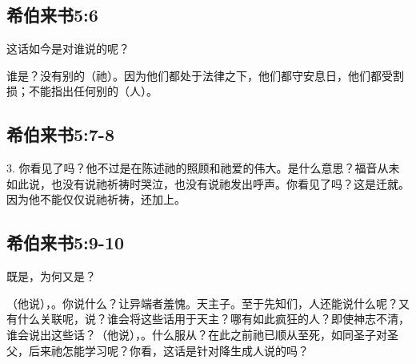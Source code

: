 
\subsection{希伯来书5:6}

这话如今是对谁说的呢？\par

谁是？没有别的（祂）。因为他们都处于法律之下，他们都守安息日，他们都受割损；不能指出任何别的（人）。\par


\subsection{希伯来书5:7-8}

3. 你看见了吗？他不过是在陈述祂的照顾和祂爱的伟大。是什么意思？福音从未如此说，也没有说祂祈祷时哭泣，也没有说祂发出呼声。你看见了吗？这是迁就。因为他不能仅仅说祂祈祷，还加上。\par


\subsection{希伯来书5:9-10}

 \par

既是，为何又是？\par

（他说），。你说什么？让异端者羞愧。天主子。至于先知们，人还能说什么呢？又有什么关联呢，说？谁会将这些话用于天主？哪有如此疯狂的人？即使神志不清，谁会说出这些话？（他说），。什么服从？在此之前祂已顺从至死，如同圣子对圣父，后来祂怎能学习呢？你看，这话是针对降生成人说的吗？\par

